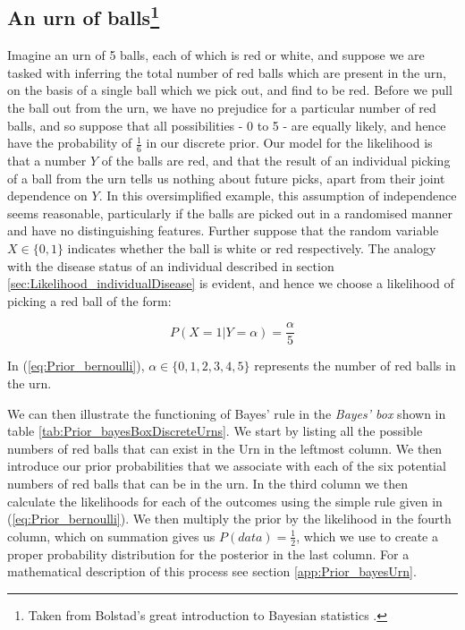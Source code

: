 \documentclass[11pt,fullpage]{book}
\begin{document}
\subsection{An urn of balls\footnote{Taken from Bolstad's great introduction to Bayesian statistics \cite{bolstad2007introduction}.}}\label{sec:Prior_urn}
Imagine an urn of 5 balls, each of which is red or white, and suppose we are tasked with inferring the total number of red balls which are present in the urn, on the basis of a single ball which we pick out, and find to be red. Before we pull the ball out from the urn, we have no prejudice for a particular number of red balls, and so suppose that all possibilities - 0 to 5 - are equally likely, and hence have the probability of $\frac{1}{6}$ in our discrete prior. Our model for the likelihood is that a number $Y$ of the balls are red, and that the result of an individual picking of a ball from the urn tells us nothing about future picks, apart from their joint dependence on $Y$. In this oversimplified example, this assumption of independence seems reasonable, particularly if the balls are picked out in a randomised manner and have no distinguishing features. Further suppose that the random variable $X\in\{0,1\}$ indicates whether the ball is white or red respectively.  The analogy with the disease status of an individual described in section \ref{sec:Likelihood_individualDisease} is evident, and hence we choose a likelihood of picking a red ball of the form:

\begin{equation}\label{eq:Prior_bernoulli}
P(X = 1|Y=\alpha) = \frac{\alpha}{5}
\end{equation}

In (\ref{eq:Prior_bernoulli}), $\alpha\in\{0,1,2,3,4,5\}$ represents the number of red balls in the urn.

We can then illustrate the functioning of Bayes' rule in the \textit{Bayes' box} shown in table \ref{tab:Prior_bayesBoxDiscreteUrns}. We start by listing all the possible numbers of red balls that can exist in the Urn in the leftmost column. We then introduce our prior probabilities that we associate with each of the six potential numbers of red balls that can be in the urn. In the third column we then calculate the likelihoods for each of the outcomes using the simple rule given in (\ref{eq:Prior_bernoulli}). We then multiply the prior by the likelihood in the fourth column, which on summation gives us $P(data)=\frac{1}{2}$, which we use to create a proper probability distribution for the posterior in the last column. For a mathematical description of this process see section \ref{app:Prior_bayesUrn}.
\end{document}
